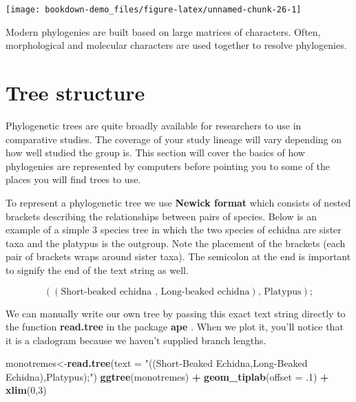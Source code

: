 \documentclass[
]{book}
\newenvironment{Shaded}{\begin{snugshade}}{\end{snugshade}}
\newcommand{\DataTypeTok}[1]{\textcolor[rgb]{0.13,0.29,0.53}{#1}}
\newcommand{\DecValTok}[1]{\textcolor[rgb]{0.00,0.00,0.81}{#1}}
\newcommand{\FloatTok}[1]{\textcolor[rgb]{0.00,0.00,0.81}{#1}}
\newcommand{\KeywordTok}[1]{\textcolor[rgb]{0.13,0.29,0.53}{\textbf{#1}}}
\newcommand{\NormalTok}[1]{#1}
\newcommand{\OperatorTok}[1]{\textcolor[rgb]{0.81,0.36,0.00}{\textbf{#1}}}
\newcommand{\StringTok}[1]{\textcolor[rgb]{0.31,0.60,0.02}{#1}}
\begin{document}
\begin{center}\texttt{[image: bookdown-demo\_files/figure-latex/unnamed-chunk-26-1]} \end{center}

Modern phylogenies are built based on large matrices of characters. Often, morphological and molecular characters are used together to resolve phylogenies.

\hypertarget{tree-structure}{%
\section{Tree structure}\label{tree-structure}}

Phylogenetic trees are quite broadly available for researchers to use in comparative studies. The coverage of your study lineage will vary depending on how well studied the group is. This section will cover the basics of how phylogenies are represented by computers before pointing you to some of the places you will find trees to use.

To represent a phylogenetic tree we use \textbf{Newick format} which consists of nested brackets describing the relationships between pairs of species. Below is an example of a simple 3 species tree in which the two species of echidna are sister taxa and the platypus is the outgroup. Note the placement of the brackets (each pair of brackets wraps around sister taxa). The semicolon at the end is important to signify the end of the text string as well.

\[ ((\text{Short-beaked echidna , Long-beaked echidna})\text{, Platypus}); \]

We can manually write our own tree by passing this exact text string directly to the function \textbf{read.tree} in the package \textbf{ape} \citep{ape}. When we plot it, you'll notice that it is a cladogram because we haven't supplied branch lengths.

\begin{Shaded}
\begin{Highlighting}[]
\NormalTok{monotremes\textless{}{-}}\KeywordTok{read.tree}\NormalTok{(}\DataTypeTok{text =} \StringTok{"((Short{-}Beaked Echidna,Long{-}Beaked Echidna),Platypus);"}\NormalTok{)}
\KeywordTok{ggtree}\NormalTok{(monotremes) }\OperatorTok{+}
\StringTok{  }\KeywordTok{geom\_tiplab}\NormalTok{(}\DataTypeTok{offset =} \FloatTok{.1}\NormalTok{) }\OperatorTok{+}
\StringTok{  }\KeywordTok{xlim}\NormalTok{(}\DecValTok{0}\NormalTok{,}\DecValTok{3}\NormalTok{)}
\end{Highlighting}
\end{Shaded}
\end{document}
